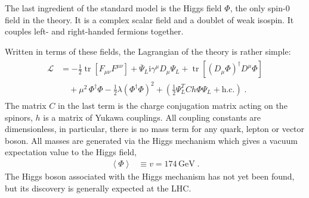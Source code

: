 \documentclass[12pt]{report}
\renewcommand{\L}{\ensuremath{\mathscr{L}}}
\DeclareMathOperator{\tr}{tr}
\renewcommand{\i}{\ensuremath{\text{i}}}
\newcommand{\2}{\ensuremath{\sqrt{2}\,}}
\renewcommand{\L}{\ensuremath{\mathscr{L}}}
\begin{document}
    The last ingredient of the standard model is the Higgs field $\Phi$, the only spin-0 field in
    the theory. It is a complex scalar field and a doublet of weak isospin. It couples 
    left- and right-handed fermions together.

    Written in terms of these fields, the Lagrangian of the theory is rather simple: 
    \begin{align}\label{eq:smLagrangian1}
      \begin{split}
        \L&= -\frac{1}{2} \tr \left[F_{\mu\nu} F^{\mu\nu}\right] +\overline{\Psi}_L \i \gamma^\mu
        D_\mu \Psi_L +\tr \left[\left(D_\mu \Phi\right)^\dagger D^\mu \Phi\right]\\
        &\quad +\mu^2 \,\Phi^\dagger\Phi -\frac{1}{2}\lambda \left(\Phi^\dagger\Phi\right)^2
        +\left(\frac{1}{2}   \Psi^T_L C h \Phi \Psi_L + \text{h.c.}\right)\;.
      \end{split}
    \end{align}
    The matrix $C$ in the last term is the charge conjugation matrix acting on the spinors, $h$ is a
    matrix of Yukawa couplings. All coupling constants are dimensionless, in particular, there is no
    mass term for any quark, lepton or vector boson. All masses are generated via the Higgs mechanism 
    which gives a vacuum
    expectation value to the Higgs field,
    \begin{align}
      \left\langle \Phi \right\rangle &\equiv v = 174\, \text{GeV}\;.
    \end{align}
    The Higgs boson associated with the Higgs mechanism has not yet been found, but its discovery
    is generally expected at the LHC.
\end{document}
